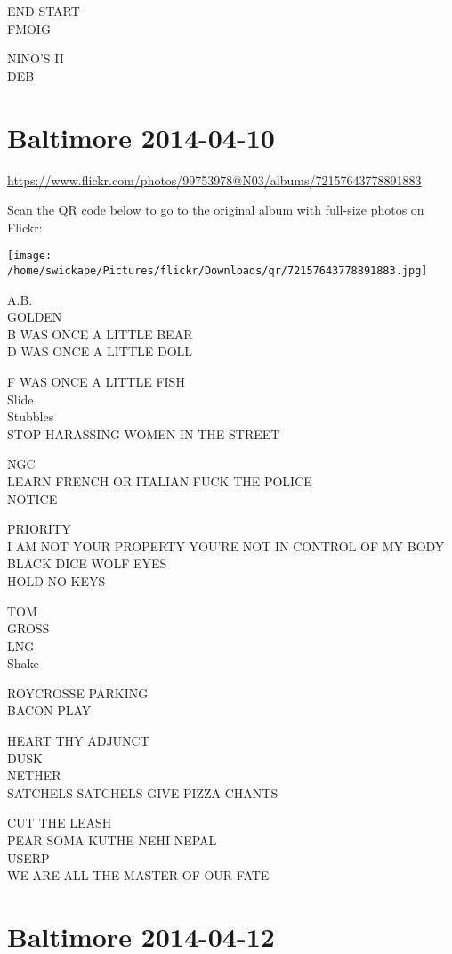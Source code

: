 \documentclass[10pt,letterpaper]{article}
\begin{document}
END START\\
FMOIG

NINO'S II\\
DEB
\pagebreak

\section*{Baltimore 2014-04-10}

\url{https://www.flickr.com/photos/99753978@N03/albums/72157643778891883}

Scan the QR code below to go to the original album with full-size photos on Flickr:

\texttt{[image: /home/swickape/Pictures/flickr/Downloads/qr/72157643778891883.jpg]}
\pagebreak

A.B.\\
GOLDEN\\
B WAS ONCE A LITTLE BEAR\\
D WAS ONCE A LITTLE DOLL

F WAS ONCE A LITTLE FISH\\
Slide\\
Stubbles\\
STOP HARASSING WOMEN IN THE STREET

NGC\\
LEARN FRENCH OR ITALIAN FUCK THE POLICE\\
NOTICE

PRIORITY\\
I AM NOT YOUR PROPERTY YOU'RE NOT IN CONTROL OF MY BODY\\
BLACK DICE WOLF EYES\\
HOLD NO KEYS

TOM\\
GROSS\\
LNG\\
Shake

ROYCROSSE PARKING\\
BACON PLAY

HEART THY ADJUNCT\\
DUSK\\
NETHER\\
SATCHELS SATCHELS GIVE PIZZA CHANTS

CUT THE LEASH\\
PEAR SOMA KUTHE NEHI NEPAL\\
USERP\\
WE ARE ALL THE MASTER OF OUR FATE
\pagebreak

\section*{Baltimore 2014-04-12}
\end{document}

